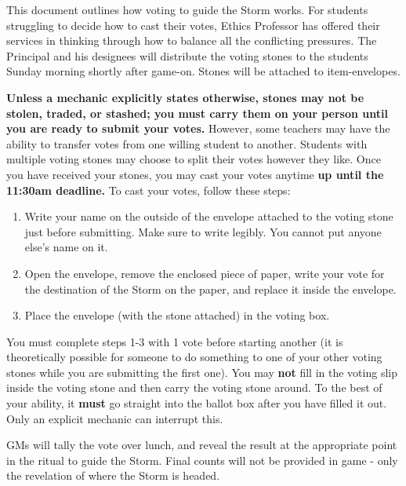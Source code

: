 \documentclass[green]{GL2020}
\begin{document}
\name{\gVotingInstructions{}}

This document outlines how voting to guide the Storm works. For students struggling to decide how to cast their votes, Ethics Professor \cEthics{\full} has offered their services in thinking through how to balance all the conflicting pressures. The Principal and his designees will distribute the voting stones to the students Sunday morning shortly after game-on. Stones will be attached to item-envelopes. 

\textbf{Unless a mechanic explicitly states otherwise, stones may not be stolen, traded, or stashed; you must carry them on your person until you are ready to submit your votes.} However, some teachers may have the ability to transfer votes from one willing student to another. Students with multiple voting stones may choose to split their votes however they like. Once you have received your stones, you may cast your votes anytime \textbf{up until the 11:30am deadline.} To cast your votes, follow these steps:

\begin{enumerate}
  \item Write your name on the outside of the envelope attached to the voting stone just before submitting. Make sure to write legibly. You cannot put anyone else’s name on it.
  \item Open the envelope, remove the enclosed piece of paper, write your vote for the destination of the Storm on the paper, and replace it inside the envelope.
  \item Place the envelope (with the stone attached) in the voting box.
\end{enumerate}

You must complete steps 1-3 with 1 vote before starting another (it is theoretically possible for someone to do something to one of your other voting stones while you are submitting the first one). You may \textbf{not} fill in the voting slip inside the voting stone and then carry the voting stone around. To the best of your ability, it \textbf{must} go straight into the ballot box after you have filled it out. Only an explicit mechanic can interrupt this.

GMs will tally the vote over lunch, and reveal the result at the appropriate point in the ritual to guide the Storm. Final counts will not be provided in game - only the revelation of where the Storm is headed.
\end{document}

